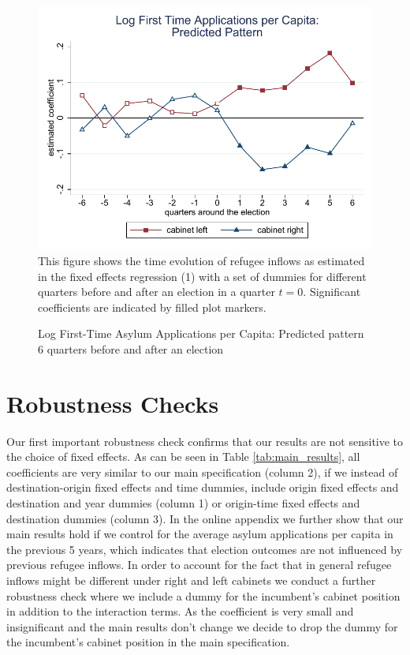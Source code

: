 \documentclass[a4paper,12pt]{article}
\begin{document}
\begin{figure}
	\centering
    \caption{Log First-Time Asylum Applications per Capita: Predicted pattern 6 quarters before and after an election}
	\includegraphics[width=1\textwidth]{inputs/app_Graph2_baseline.pdf}
	      {\footnotesize This figure shows the time evolution of refugee inflows as estimated in the fixed effects regression (1) with a set of dummies for different quarters before and after an election in a quarter $t=0$. Significant coefficients are indicated by filled plot markers.}\\
\label{main_results_quarters}
\end{figure}

\section{Robustness Checks}\label{sec:robustness}
Our first important robustness check confirms that our results are not sensitive to the choice of fixed effects. As can be seen in Table \ref{tab:main_results}, all coefficients are very similar to our main specification (column 2), if we instead of destination-origin fixed effects and time dummies, include origin fixed effects and destination and year dummies (column 1)  or origin-time fixed effects and destination dummies (column 3).  In the online appendix we further show that our main results hold if we control for the average asylum applications per capita in the previous 5 years, which indicates that election outcomes are not influenced by previous refugee inflows.  In order to account for the fact that in general refugee inflows might be different under right and left cabinets we conduct a further robustness check where we include a dummy for the incumbent's cabinet position  in addition to the interaction terms.  As the coefficient is very small and insignificant and the main results don't change we decide to drop the dummy for the incumbent's cabinet position in the main specification.  
\end{document}
